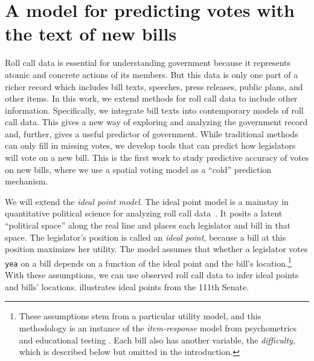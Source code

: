 \section{A model for predicting votes with the text of new bills}
Roll call data is essential for understanding government because it
represents atomic and concrete actions of its members.  But this data
is only one part of a richer record which includes bill texts,
speeches, press releases, public plans, and other items.  In this
work, we extend methods for roll call data to include other
information.  Specifically, we integrate bill texts into contemporary
models of roll call data.  This gives a new way of exploring and
analyzing the government record and, further, gives a useful predictor
of government.  While traditional methods can only fill in missing
votes, we develop tools that can predict how legislators will vote on
a new bill. This is the first work to study predictive accuracy of
votes on new bills, where we use a spatial voting model as a ``cold''
prediction mechanism.

We will extend the \textit{ideal point model}.  The ideal point model
is a mainstay in quantitative political science for analyzing roll
call data~\cite{clinton:2004}.  It posits a latent ``political space''
along the real line and places each legislator and bill in that
space. The legislator's position is called an \textit{ideal point},
because a bill at this position maximizes her utility.  The model
assumes that whether a legislator votes \verb!yea! on a bill depends
on a function of the ideal point and the bill's
location.\footnote{These assumptions stem from a particular utility
model, and this methodology is an instance of the
\textit{item-response} model from psychometrics and educational
testing \cite{lord:1980}.  Each bill also has another variable, the
\textit{difficulty}, which is described below but omitted in the
introduction.}  With these assumptions, we can use observed roll call
data to infer ideal points and bills' locations.  
illustrates ideal points from the 111th Senate.


